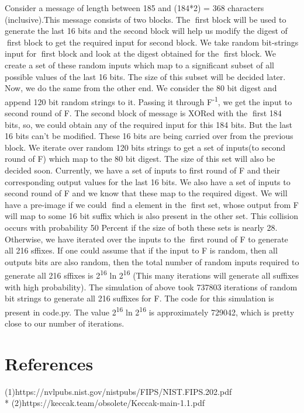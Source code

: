 \documentclass[12 pt,a4paper]{article}
\begin{document}
Consider a message of length between 185 and (184*2) = 368 characters (inclusive).This message
consists of two blocks. The first block will be used to generate the last 16 bits and the second block
will help us modify the digest of first block to get the required input for second block.
We take random bit-strings input for first block and look at the digest obtained for the first block.
We create a set of these random inputs which map to a significant subset of all possible values of the
last 16 bits. The size of this subset will be decided later. Now, we do the same from the other end.
We consider the 80 bit digest and append 120 bit random strings to it.
Passing it through F\textsuperscript{-1}, we
get the input to second round of F. The second block of message is XORed with the first 184 bits,
so, we could obtain any of the required input for this 184 bits. But the last 16 bits can't be modified.
These 16 bits are being carried over from the previous block. We iterate over random 120 bits strings
to get a set of inputs(to second round of F) which map to the 80 bit digest. The size of this set will
also be decided soon.
Currently, we have a set of inputs to first round of F and their corresponding output values for
the last 16 bits. We also have a set of inputs to second round of F and we know that these map to
the required digest. We will have a pre-image if we could find a element in the first set, whose output
from F will map to some 16 bit suffix which is also present in the other set. This collision occurs with
probability 50 Percent if the size of both these sets is nearly 28.
Otherwise, we have iterated over the inputs to the first round of F to generate all 216 sffixes. If
one could assume that if the input to F is random, then all outputs bits are also random, then the
total number of random inputs required to generate all 216 sffixes is 2\textsuperscript{16} ln 2\textsuperscript{16} (This many iterations
will generate all suffixes with high probability).
The simulation of above took 737803 iterations of random bit strings to generate all 216 suffixes
for F. The code for this simulation is present in code.py. The value 2\textsuperscript{16} ln 2\textsuperscript{16} is approximately
729042, which is pretty close to our number of iterations.
\section{References}
(1)https://nvlpubs.nist.gov/nistpubs/FIPS/NIST.FIPS.202.pdf\\*
(2)https://keccak.team/obsolete/Keccak-main-1.1.pdf
\end{document}
